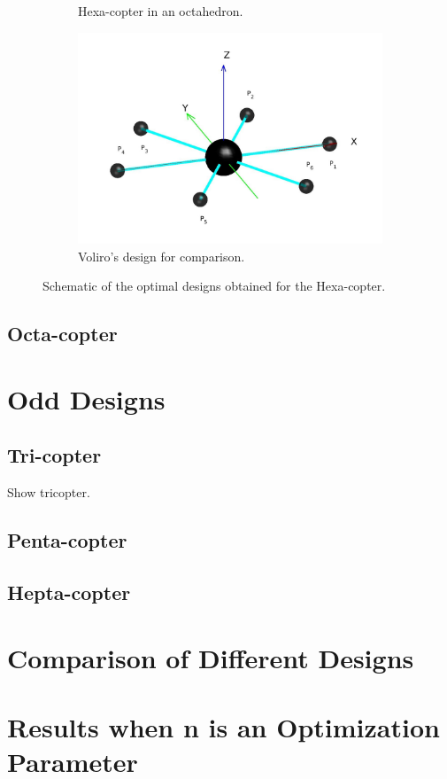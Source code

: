 \begin{figure}[!h]
{\begin{subfigure}[b]{0.5\textwidth}
    \caption{Hexa-copter in an octahedron.} \label{fig:Hexacopter_resultb}
  \end{subfigure}
  \hspace*{\fill} %
  \begin{subfigure}[b]{0.7\textwidth}
    \includegraphics[width=\linewidth]{images/Voliro.jpg}
    \caption{Voliro's design for comparison.} \label{fig:Hexacopter_resultc}
  \end{subfigure}}
  \caption{Schematic of the optimal designs obtained for the Hexa-copter.}
  \label{fig:Hexacopter_result}
\end{figure}

\subsection{Octa-copter}
\label{sec:octa_copter}

\section{Odd Designs}
\label{sec:odd_designs}

\subsection{Tri-copter}
\label{sec:tri_copter}
Show tricopter.

\subsection{Penta-copter}
\label{sec:penta_copter}

\subsection{Hepta-copter}
\label{sec:hepta_copter}

\section{Comparison of Different Designs}
\label{sec:comparison}
\section{Results when n is an Optimization Parameter}
\label{sec:result_n}
